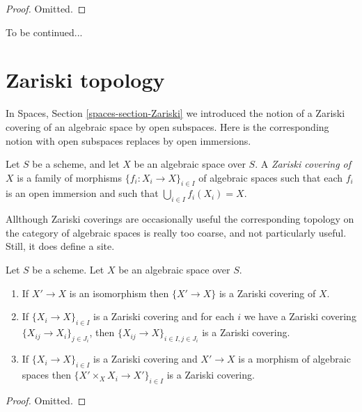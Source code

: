 \begin{proof}
Omitted.
\end{proof}

\noindent
To be continued...




\section{Zariski topology}
\label{section-zariski}

\noindent
In
Spaces, Section \ref{spaces-section-Zariski}
we introduced the notion of a Zariski covering of an algebraic space by
open subspaces. Here is the corresponding notion with open subspaces
replaces by open immersions.

\begin{definition}
\label{definition-zariski-covering}
Let $S$ be a scheme, and let $X$ be an algebraic space over $S$.
A {\it Zariski covering of $X$} is a family of morphisms
$\{f_i : X_i \to X\}_{i \in I}$ of algebraic spaces
such that each $f_i$ is an open immersion
and such that $\bigcup_{i \in I} f_i(X_i) = X$.
\end{definition}

\noindent
Allthough Zariski coverings are occasionally useful the corresponding topology
on the category of algebraic spaces is really too coarse, and not particularly
useful. Still, it does define a site.

\begin{lemma}
\label{lemma-zariski}
Let $S$ be a scheme.
Let $X$ be an algebraic space over $S$.
\begin{enumerate}
\item If $X' \to X$ is an isomorphism then $\{X' \to X\}$
is a Zariski covering of $X$.
\item If $\{X_i \to X\}_{i\in I}$ is a Zariski covering and for each
$i$ we have a Zariski covering $\{X_{ij} \to X_i\}_{j\in J_i}$, then
$\{X_{ij} \to X\}_{i \in I, j\in J_i}$ is a Zariski covering.
\item If $\{X_i \to X\}_{i\in I}$ is a Zariski covering
and $X' \to X$ is a morphism of algebraic spaces then
$\{X' \times_X X_i \to X'\}_{i\in I}$ is a Zariski covering.
\end{enumerate}
\end{lemma}

\begin{proof}
Omitted.
\end{proof}











